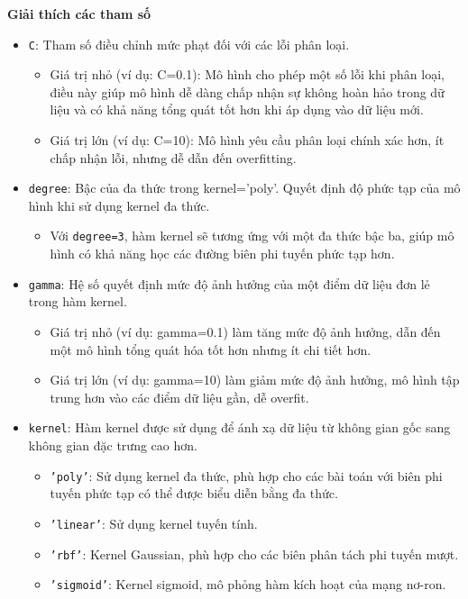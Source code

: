 \documentclass[a4paper,12pt]{article}
\begin{document}
\noindent \textbf{Giải thích các tham số}
\begin{itemize}
    \item \texttt{C}: Tham số điều chỉnh mức phạt đối với các lỗi phân loại.
    \begin{itemize}
        \item Giá trị nhỏ (ví dụ: C=0.1): Mô hình cho phép một số lỗi khi phân loại, điều này giúp mô hình dễ dàng chấp nhận sự không hoàn hảo trong dữ liệu và có khả năng tổng quát tốt hơn khi áp dụng vào dữ liệu mới.
        \item Giá trị lớn (ví dụ: C=10): Mô hình yêu cầu phân loại chính xác hơn, ít chấp nhận lỗi, nhưng dễ dẫn đến overfitting.
    \end{itemize}

    \item \texttt{degree}: Bậc của đa thức trong kernel='poly'. Quyết định độ phức tạp của mô hình khi sử dụng kernel đa thức.
    \begin{itemize}
        \item Với \texttt{degree=3}, hàm kernel sẽ tương ứng với một đa thức bậc ba, giúp mô hình có khả năng học các đường biên phi tuyến phức tạp hơn.
    \end{itemize}

    \item \texttt{gamma}: Hệ số quyết định mức độ ảnh hưởng của một điểm dữ liệu đơn lẻ trong hàm kernel.
    \begin{itemize}
        \item Giá trị nhỏ (ví dụ: gamma=0.1) làm tăng mức độ ảnh hưởng, dẫn đến một mô hình tổng quát hóa tốt hơn nhưng ít chi tiết hơn.
        \item Giá trị lớn (ví dụ: gamma=10) làm giảm mức độ ảnh hưởng, mô hình tập trung hơn vào các điểm dữ liệu gần, dễ overfit.
    \end{itemize}

    \item \texttt{kernel}: Hàm kernel được sử dụng để ánh xạ dữ liệu từ không gian gốc sang không gian đặc trưng cao hơn.
    \begin{itemize}
        \item \texttt{'poly'}: Sử dụng kernel đa thức, phù hợp cho các bài toán với biên phi tuyến phức tạp có thể được biểu diễn bằng đa thức.
        \item \texttt{'linear'}: Sử dụng kernel tuyến tính.
        \item \texttt{'rbf'}: Kernel Gaussian, phù hợp cho các biên phân tách phi tuyến mượt.
        \item \texttt{'sigmoid'}: Kernel sigmoid, mô phỏng hàm kích hoạt của mạng nơ-ron.
    \end{itemize}
\end{itemize}
\end{document}

